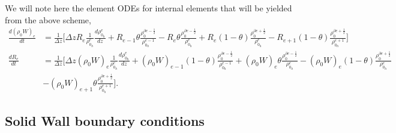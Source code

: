 \documentclass[a4paper,11pt]{article}
\begin{document}
We will note here the element ODEs for internal elements that will be yielded from the above scheme,
\begin{equation}
\begin{aligned}
\frac{d (\rho_0 W)_e}{d t} & = \frac{1}{\Delta z}\bigg [   \Delta z R_e \frac{1}{\rho^e_{0{{}_h}}} \frac{d\rho^e_{0{{}_h}}}{dz}  + R_{e-1} \theta \frac{\rho_0^{\partial e - \frac{1}{2}}}{\rho_{0{{}_h}}^{e-1}} - R_{e} \theta\frac{\rho_0^{\partial e - \frac{1}{2}}}{\rho_{0{{}_h}}^{e}}+ R_{e}(1-\theta)\frac{\rho_0^{\partial e + \frac{1}{2}}}{\rho_{0{{}_h}}^{e}} - R_{e+1}(1-\theta)   \frac{\rho_0^{\partial e + \frac{1}{2}}}{\rho_{0{{}_h}}^{e+1}}              \bigg]\\
\frac{d R_e}{d t} & = \frac{1}{\Delta z}\bigg [ \Delta z (\rho_0 W)_e \frac{1}{\rho^e_{0{{}_h}}} \frac{d\rho^e_{0{{}_h}}}{dz} +   (\rho_0 W)_{e-1}(1-\theta)\frac{\rho_0^{\partial e - \frac{1}{2}}}{\rho_{0{{}_h}}^{e-1}}  + (\rho_0 W)_{e} \theta\frac{\rho_0^{\partial e - \frac{1}{2}}}{\rho_{0{{}_h}}^{e}}  - (\rho_0 W)_{e}(1-\theta)\frac{\rho_0^{\partial e + \frac{1}{2}}}{\rho_{0{{}_h}}^{e}}   \\  &- (\rho_0 W)_{e+1}\theta \frac{\rho_0^{\partial e + \frac{1}{2}}}{\rho_{0{{}_h}}^{e+1}}      \bigg].
\end{aligned}
\end{equation}

\subsection{ Solid Wall boundary conditions}
\end{document}
